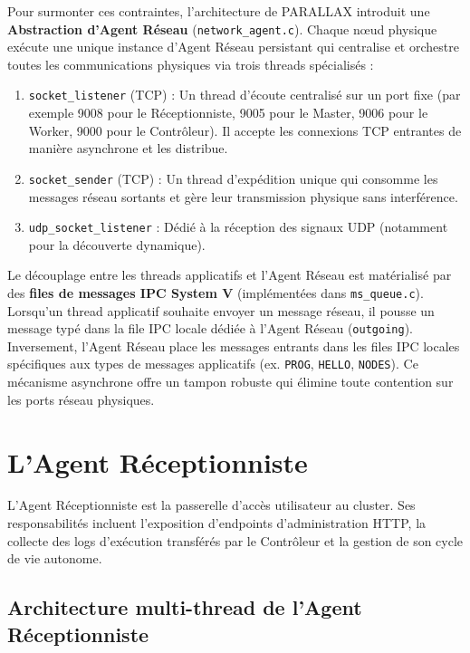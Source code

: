 \documentclass[12pt,a4paper]{report}
\begin{document}
Pour surmonter ces contraintes, l'architecture de PARALLAX introduit une \textbf{Abstraction d'Agent Réseau} (\texttt{network\_agent.c}). Chaque nœud physique exécute une unique instance d'Agent Réseau persistant qui centralise et orchestre toutes les communications physiques via trois threads spécialisés :
\begin{enumerate}
    \item \texttt{socket\_listener} (TCP) : Un thread d'écoute centralisé sur un port fixe (par exemple 9008 pour le Réceptionniste, 9005 pour le Master, 9006 pour le Worker, 9000 pour le Contrôleur). Il accepte les connexions TCP entrantes de manière asynchrone et les distribue.
    \item \texttt{socket\_sender} (TCP) : Un thread d'expédition unique qui consomme les messages réseau sortants et gère leur transmission physique sans interférence.
    \item \texttt{udp\_socket\_listener} : Dédié à la réception des signaux UDP (notamment pour la découverte dynamique).
\end{enumerate}

Le découplage entre les threads applicatifs et l'Agent Réseau est matérialisé par des \textbf{files de messages IPC System V} (implémentées dans \texttt{ms\_queue.c}). Lorsqu'un thread applicatif souhaite envoyer un message réseau, il pousse un message typé dans la file IPC locale dédiée à l'Agent Réseau (\texttt{outgoing}). Inversement, l'Agent Réseau place les messages entrants dans les files IPC locales spécifiques aux types de messages applicatifs (ex. \texttt{PROG}, \texttt{HELLO}, \texttt{NODES}). Ce mécanisme asynchrone offre un tampon robuste qui élimine toute contention sur les ports réseau physiques.

\section{L'Agent Réceptionniste}

L'Agent Réceptionniste est la passerelle d'accès utilisateur au cluster. Ses responsabilités incluent l'exposition d'endpoints d'administration HTTP, la collecte des logs d'exécution transférés par le Contrôleur et la gestion de son cycle de vie autonome.

\subsection{Architecture multi-thread de l'Agent Réceptionniste}
\end{document}
